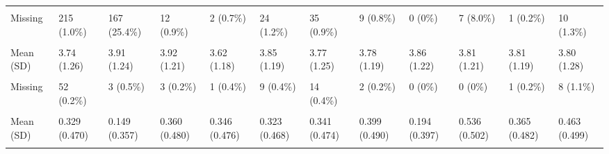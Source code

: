 \documentclass[
  single column]{article}
\begin{document}
\begin{landscape}
\begin{longtable}[t]{llllllllllll}
\cellcolor{gray!10}{asian} & \cellcolor{gray!10}{760 (3.5\%)} & \cellcolor{gray!10}{399 (60.6\%)} & \cellcolor{gray!10}{18 (1.3\%)} & \cellcolor{gray!10}{68 (25.2\%)} & \cellcolor{gray!10}{149 (7.4\%)} & \cellcolor{gray!10}{192 (5.2\%)} & \cellcolor{gray!10}{34 (3.1\%)} & \cellcolor{gray!10}{82 (60.3\%)} & \cellcolor{gray!10}{1 (1.1\%)} & \cellcolor{gray!10}{1 (0.2\%)} & \cellcolor{gray!10}{36 (4.8\%)}\\
\addlinespace
Missing & 215 (1.0\%) & 167 (25.4\%) & 12 (0.9\%) & 2 (0.7\%) & 24 (1.2\%) & 35 (0.9\%) & 9 (0.8\%) & 0 (0\%) & 7 (8.0\%) & 1 (0.2\%) & 10 (1.3\%)\\
\cellcolor{gray!10}{Extraversion (Personality Trait)} & \cellcolor{gray!10}{} & \cellcolor{gray!10}{} & \cellcolor{gray!10}{} & \cellcolor{gray!10}{} & \cellcolor{gray!10}{} & \cellcolor{gray!10}{} & \cellcolor{gray!10}{} & \cellcolor{gray!10}{} & \cellcolor{gray!10}{} & \cellcolor{gray!10}{} & \cellcolor{gray!10}{}\\
Mean (SD) & 3.74 (1.26) & 3.91 (1.24) & 3.92 (1.21) & 3.62 (1.18) & 3.85 (1.19) & 3.77 (1.25) & 3.78 (1.19) & 3.86 (1.22) & 3.81 (1.21) & 3.81 (1.19) & 3.80 (1.28)\\
\cellcolor{gray!10}{Median [Min, Max]} & \cellcolor{gray!10}{3.75 [1.00, 7.00]} & \cellcolor{gray!10}{4.00 [1.00, 7.00]} & \cellcolor{gray!10}{4.00 [1.00, 7.00]} & \cellcolor{gray!10}{3.67 [1.00, 7.00]} & \cellcolor{gray!10}{4.00 [1.00, 7.00]} & \cellcolor{gray!10}{3.75 [1.00, 7.00]} & \cellcolor{gray!10}{3.75 [1.00, 7.00]} & \cellcolor{gray!10}{4.00 [1.50, 7.00]} & \cellcolor{gray!10}{3.75 [1.00, 6.25]} & \cellcolor{gray!10}{3.75 [1.00, 7.00]} & \cellcolor{gray!10}{3.75 [1.00, 7.00]}\\
Missing & 52 (0.2\%) & 3 (0.5\%) & 3 (0.2\%) & 1 (0.4\%) & 9 (0.4\%) & 14 (0.4\%) & 2 (0.2\%) & 0 (0\%) & 0 (0\%) & 1 (0.2\%) & 8 (1.1\%)\\
\addlinespace
\cellcolor{gray!10}{Health Disability Status (Yes/No)} & \cellcolor{gray!10}{} & \cellcolor{gray!10}{} & \cellcolor{gray!10}{} & \cellcolor{gray!10}{} & \cellcolor{gray!10}{} & \cellcolor{gray!10}{} & \cellcolor{gray!10}{} & \cellcolor{gray!10}{} & \cellcolor{gray!10}{} & \cellcolor{gray!10}{} & \cellcolor{gray!10}{}\\
Mean (SD) & 0.329 (0.470) & 0.149 (0.357) & 0.360 (0.480) & 0.346 (0.476) & 0.323 (0.468) & 0.341 (0.474) & 0.399 (0.490) & 0.194 (0.397) & 0.536 (0.502) & 0.365 (0.482) & 0.463 (0.499)\\
\cellcolor{gray!10}{Median [Min, Max]} & \cellcolor{gray!10}{0 [0, 1.00]} & \cellcolor{gray!10}{0 [0, 1.00]} & \cellcolor{gray!10}{0 [0, 1.00]} & \cellcolor{gray!10}{0 [0, 1.00]} & \cellcolor{gray!10}{0 [0, 1.00]} & \cellcolor{gray!10}{0 [0, 1.00]} & \cellcolor{gray!10}{0 [0, 1.00]} & \cellcolor{gray!10}{0 [0, 1.00]} & \cellcolor{gray!10}{1.00 [0, 1.00]} & \cellcolor{gray!10}{0 [0, 1.00]} & \cellcolor{gray!10}{0 [0, 1.00]}\\

\end{longtable}
\end{landscape}
\end{document}
